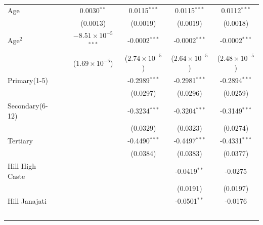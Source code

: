 \begin{tabular}{lccccc}
   Age                                         &                 & 0.0030$^{**}$                  & 0.0115$^{***}$          & 0.0115$^{***}$          & 0.0112$^{***}$\\   
                                               &                 & (0.0013)                       & (0.0019)                & (0.0019)                & (0.0018)\\   
   Age$^2$                                &                 & $-8.51\times 10^{-5}$$^{***}$  & -0.0002$^{***}$         & -0.0002$^{***}$         & -0.0002$^{***}$\\   
                                               &                 & ($1.69\times 10^{-5}$)         & ($2.74\times 10^{-5}$)  & ($2.64\times 10^{-5}$)  & ($2.48\times 10^{-5}$)\\    
   Primary(1-5)     &                 &                                & -0.2989$^{***}$         & -0.2981$^{***}$         & -0.2894$^{***}$\\   
                                               &                 &                                & (0.0297)                & (0.0296)                & (0.0259)\\   
   Secondary(6-12)  &                 &                                & -0.3234$^{***}$         & -0.3204$^{***}$         & -0.3149$^{***}$\\   
                                               &                 &                                & (0.0329)                & (0.0323)                & (0.0274)\\   
   Tertiary         &                 &                                & -0.4490$^{***}$         & -0.4497$^{***}$         & -0.4331$^{***}$\\   
                                               &                 &                                & (0.0384)                & (0.0383)                & (0.0377)\\   
   Hill High Caste              &                 &                                &                         & -0.0419$^{**}$          & -0.0275\\   
                                               &                 &                                &                         & (0.0191)                & (0.0197)\\   
   Hill Janajati               &                 &                                &                         & -0.0501$^{**}$          & -0.0176\\   
$$
\end{tabular}
